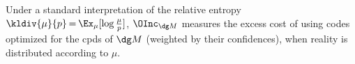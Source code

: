 Under a standard interpretation of the relative entropy $\kldiv{\mu}{p} \mskip-1.5mu=\mskip-1.5mu \Ex_{\mu}[\log \frac\mu p]$,
$\OInc_{\dg M}$ measures the excess cost of using codes optimized for the cpds of $\dg M$ 
(weighted by their confidences),
when reality is
distributed according to $\mu$.

